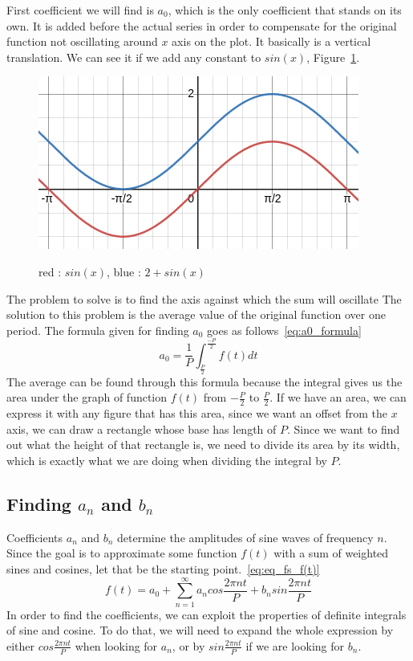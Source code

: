 \documentclass[titlepage]{article}
\begin{document}
    First coefficient we will find is $a_0$, which is the only coefficient that 
    stands on its own. It is added before the actual series in order to compensate
    for the original function not oscillating around $x$ axis on the plot. It 
    basically is a vertical translation. We can see it if we add any constant
    to $sin(x)$, Figure~\ref{fig:sine_translation}.
    \begin{figure}[H]
        \caption{red : $sin(x)$, blue : $2 + sin(x)$}
        \centering
        \includegraphics[width=0.5\linewidth]{translated_vanilla_sinewave}
        \label{fig:sine_translation}
    \end{figure}
    The problem to solve is to find the axis against which the sum will oscillate
    The solution to this problem is the average
    value of the original function over one period. The formula given for finding
    $a_0$ goes as follows~\eqref{eq:a0_formula}
    \begin{equation}\label{eq:a0_formula}
        a_0 = \frac{1}{P}\int_{\frac{P}{2}}^{\frac{-P}{2}}f(t)dt
    \end{equation}
    The average can be found through this formula because the 
    integral gives us the area under the graph of function $f(t)$ from 
    $-\frac{P}{2}$ to $\frac{P}{2}$. If we have an area, we can express it with 
    any figure that has this area, since we want an offset from the $x$ axis, 
    we can draw a rectangle whose base has length of $P$. Since we want to find
    out what the height of that rectangle is, we need to divide its area by its
    width, which is exactly what we are doing when dividing the integral by $P$.

\subsection{Finding $a_n$ and $b_n$}

    Coefficients $a_n$ and $b_n$ determine the amplitudes of sine waves of frequency
    $n$. Since the goal is to approximate some function $f(t)$ with a sum of 
    weighted sines and cosines, let that be the starting point.~\eqref{eq:eq_fs_f(t)}
    \begin{equation} \label{eq:eq_fs_f(t)}
        f(t) = a_0 + \sum_{n=1}^{\infty}a_ncos\frac{2\pi nt}{P} + b_n%
            sin\frac{2\pi nt}{P}
    \end{equation}
    In order to find the coefficients, we can exploit the properties of definite
    integrals of sine and cosine. To do that, we will need to expand the whole 
    expression by either $cos\frac{2\pi nt}{P}$ when looking for $a_n$, or by 
    $sin\frac{2\pi nt}{P}$ if we are looking for $b_n$. 
\end{document}

